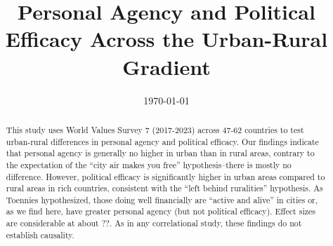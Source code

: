 \documentclass[10pt, letterpaper]{article}
\date{{}\today \hspace{.2in}\xxivtime}
\title{  
  Personal Agency and Political Efficacy Across the Urban-Rural Gradient  
}
\author{
}
\begin{document}

\maketitle
\vspace{-.4in}
\begin{center}

\end{center}


\begin{abstract}
  \noindent This study uses World Values Survey 7 (2017-2023) across 47-62 countries
  to test urban-rural differences in personal agency and political efficacy.  
%
  Our findings indicate that personal agency is generally no higher in urban than in rural areas, contrary to the expectation of the ``city air makes you free'' hypothesis--there is mostly no difference. However, political efficacy is significantly higher in urban areas compared to rural areas in rich countries, consistent with the ``left behind ruralities'' hypothesis. As Toennies hypothesized, those doing well financially are ``active and alive'' in cities or, as we find here, have greater personal agency (but not political efficacy). Effect sizes are considerable at about ??. As in any correlational study, these findings do not establish causality. 
\end{abstract}
\vspace{.15in} 
\vspace{.25in} 

\end{document}
